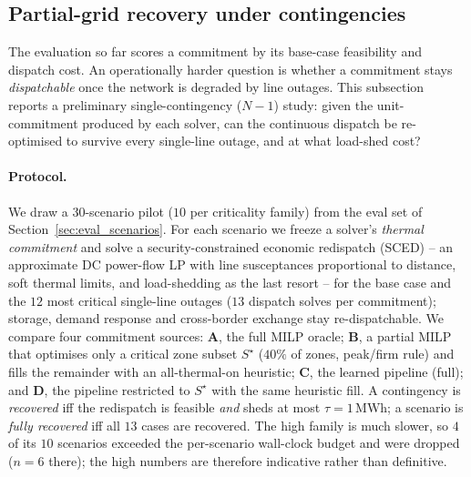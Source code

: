 \documentclass{article}
\begin{document}
\subsection{Partial-grid recovery under contingencies}
\label{sec:contingency_recovery}

The evaluation so far scores a commitment by its base-case feasibility and dispatch cost. An operationally harder question is whether a commitment stays \emph{dispatchable} once the network is degraded by line outages. This subsection reports a preliminary single-contingency ($N{-}1$) study: given the unit-commitment produced by each solver, can the continuous dispatch be re-optimised to survive every single-line outage, and at what load-shed cost?

\paragraph{Protocol.} We draw a $30$-scenario pilot ($10$ per criticality family) from the eval set of Section~\ref{sec:eval_scenarios}. For each scenario we freeze a solver's \emph{thermal commitment} and solve a security-constrained economic redispatch (SCED) -- an approximate DC power-flow LP with line susceptances proportional to distance, soft thermal limits, and load-shedding as the last resort -- for the base case and the $12$ most critical single-line outages ($13$ dispatch solves per commitment); storage, demand response and cross-border exchange stay re-dispatchable. We compare four commitment sources: \textbf{A}, the full MILP oracle; \textbf{B}, a partial MILP that optimises only a critical zone subset $S^\star$ ($40\%$ of zones, peak/firm rule) and fills the remainder with an all-thermal-on heuristic; \textbf{C}, the learned pipeline (full); and \textbf{D}, the pipeline restricted to $S^\star$ with the same heuristic fill. A contingency is \emph{recovered} iff the redispatch is feasible \emph{and} sheds at most $\tau = 1\,\mathrm{MWh}$; a scenario is \emph{fully recovered} iff all $13$ cases are recovered. The high family is much slower, so $4$ of its $10$ scenarios exceeded the per-scenario wall-clock budget and were dropped ($n=6$ there); the high numbers are therefore indicative rather than definitive.
\end{document}
